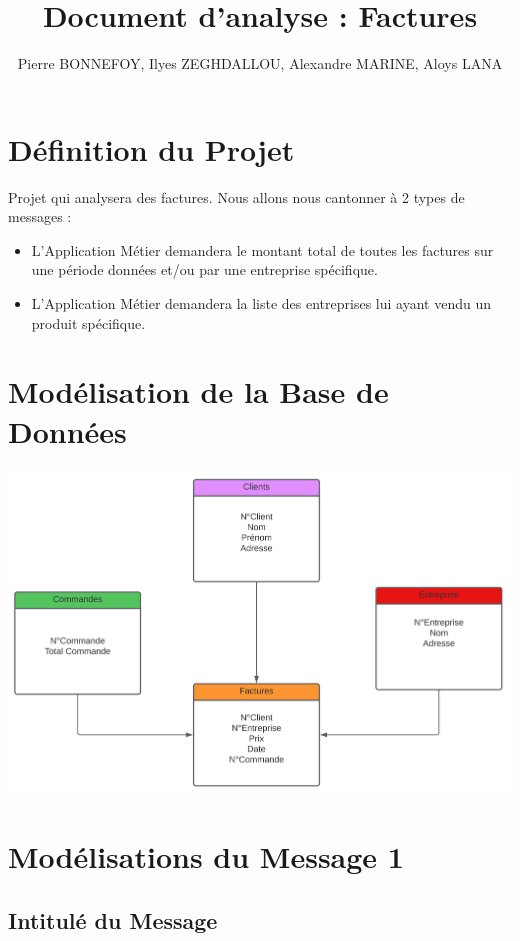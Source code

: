 \documentclass[a4paper, 11pt]{article}
\title{Document d'analyse : Factures}
\author{Pierre BONNEFOY, Ilyes ZEGHDALLOU, Alexandre MARINE, Aloys LANA}
\begin{document}
\maketitle

\tableofcontents

\newpage
\section{Définition du Projet}
Projet qui analysera des factures. Nous allons nous cantonner à 2 types de messages :
\begin{itemize}
    \item L'Application Métier demandera le montant total de toutes les factures sur une période données et/ou par une entreprise spécifique.
    \item L'Application Métier demandera la liste des entreprises lui ayant vendu un produit spécifique.
\end{itemize}

\section{Modélisation de la Base de Données}
    \begin{center}
    \includegraphics[scale=0.3]{schema_bdd.png}
    \end{center}

\section{Modélisations du Message 1}
    \subsection{Intitulé du Message}
\end{document}
